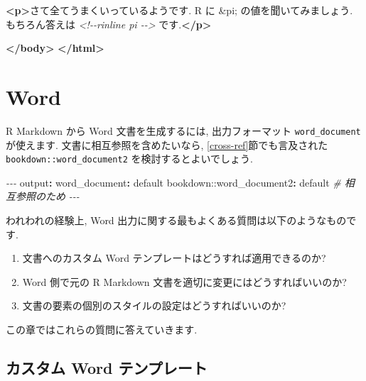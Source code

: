 \documentclass[
  11pt,
  lualatex,
  ja=standard]{bxjsreport}
\newenvironment{Shaded}{\begin{snugshade}}{\end{snugshade}}
\newcommand{\AttributeTok}[1]{\textcolor[rgb]{0.77,0.63,0.00}{#1}}
\newcommand{\CommentTok}[1]{\textcolor[rgb]{0.56,0.35,0.01}{\textit{#1}}}
\newcommand{\DecValTok}[1]{\textcolor[rgb]{0.00,0.00,0.81}{#1}}
\newcommand{\FunctionTok}[1]{\textcolor[rgb]{0.00,0.00,0.00}{#1}}
\newcommand{\KeywordTok}[1]{\textcolor[rgb]{0.13,0.29,0.53}{\textbf{#1}}}
\newcommand{\NormalTok}[1]{#1}
\newcommand{\PreprocessorTok}[1]{\textcolor[rgb]{0.56,0.35,0.01}{\textit{#1}}}
\begin{document}
\begin{Shaded}
\begin{Highlighting}[]
  \KeywordTok{\textless{}p\textgreater{}}\NormalTok{さて全てうまくいっているようです. R に }\DecValTok{\&pi;}\NormalTok{ の値を聞いてみましょう. もちろん答えは }\CommentTok{\textless{}!{-}{-}rinline pi {-}{-}\textgreater{}}\NormalTok{ です.}\KeywordTok{\textless{}/p\textgreater{}}

\KeywordTok{\textless{}/body\textgreater{}}
\KeywordTok{\textless{}/html\textgreater{}}
\end{Highlighting}
\end{Shaded}

\hypertarget{word}{%
\chapter{Word}\label{word}}

R Markdown から Word 文書を生成するには, 出力フォーマット \texttt{word\_document} が使えます. 文書に相互参照を含めたいなら, \ref{cross-ref}節でも言及された \texttt{bookdown::word\_document2} を検討するとよいでしょう.

\begin{Shaded}
\begin{Highlighting}[]
\PreprocessorTok{{-}{-}{-}}
\FunctionTok{output}\KeywordTok{:}
\AttributeTok{  }\FunctionTok{word\_document}\KeywordTok{:}\AttributeTok{ default}
\AttributeTok{  bookdown::word\_document2}\KeywordTok{:}\FunctionTok{}\AttributeTok{ default}\CommentTok{  \# 相互参照のため}
\PreprocessorTok{{-}{-}{-}}
\end{Highlighting}
\end{Shaded}

われわれの経験上, Word 出力に関する最もよくある質問は以下のようなものです.

\begin{enumerate}
\def\labelenumi{\arabic{enumi}.}
\item
  文書へのカスタム Word テンプレートはどうすれば適用できるのか?
\item
  Word 側で元の R Markdown 文書を適切に変更にはどうすればいいのか?
\item
  文書の要素の個別のスタイルの設定はどうすればいいのか?
\end{enumerate}

この章ではこれらの質問に答えていきます.

\hypertarget{word-template}{%
\section{カスタム Word テンプレート}\label{word-template}}
\end{document}

